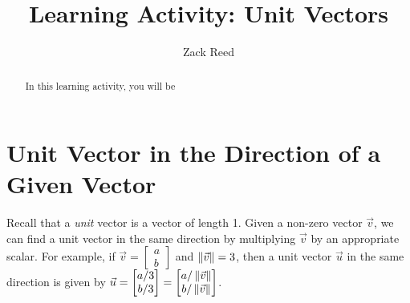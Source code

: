 \documentclass{ximera}
\author{Zack Reed}
\title{Learning Activity: Unit Vectors}
\begin{document}
\begin{abstract}

    In this learning activity, you will be 
\end{abstract}
\maketitle

\section*{Unit Vector in the Direction of a Given Vector}
Recall that a {\it unit} vector is a vector of length 1.  Given a non-zero vector $\vec{v}$, we can find a unit vector in the same direction by multiplying $\vec{v}$ by an appropriate scalar.  For example, if $\vec{v}=\begin{bmatrix}a\\b\end{bmatrix}$ and $\left\|\vec{v}\right\|=3$, then a unit vector $\vec{u}$ in the same direction is given by $\vec{u}=\begin{bmatrix}a/3\\b/3\end{bmatrix}=\begin{bmatrix}a/\left\|\vec{v}\right\|\\b/\left\|\vec{v}\right\|\end{bmatrix}$.


 
\begin{center}
\end{center}
\end{document}
